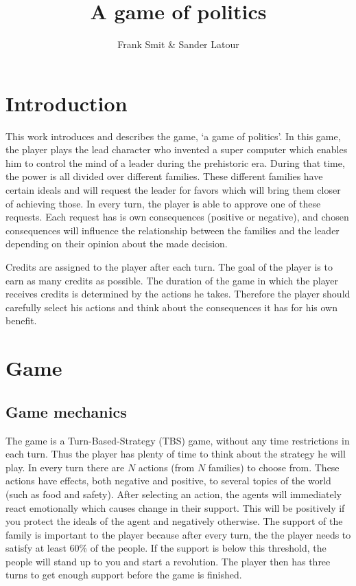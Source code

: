 \documentclass[11pt,a4paper]{article}
\author{Frank Smit \& Sander Latour}
\title{A game of politics}
\begin{document}
\maketitle

\section{Introduction}
This work introduces and describes the game, `a game of politics'. In this game, the player plays the lead character who invented a super computer which enables him to control the mind of a leader during the prehistoric era. During that time, the power is all divided over different families. These different families have certain ideals and will request the leader for favors which will bring them closer of achieving those. In every turn, the player is able to approve one of these requests. Each request has is own consequences (positive or negative), and chosen consequences will influence the relationship between the families and the leader depending on their opinion about the made decision.

Credits are assigned to the player after each turn. The goal of the player is to earn as many credits as possible. The duration of the game in which the player receives credits is determined by the actions he takes. Therefore the player should carefully select his actions and think about the consequences it has for his own benefit.  

\section{Game}
\subsection{Game mechanics}
The game is a Turn-Based-Strategy (TBS) game, without any time restrictions in each turn. Thus the player has plenty of time to think about the strategy he will play. In every turn there are $N$ actions (from $N$ families) to choose from. These actions have effects, both negative and positive, to several topics of the world (such as food and safety).  After selecting an action, the agents will immediately react emotionally which causes change in their support. This will be positively if you protect the ideals of the agent and negatively otherwise. The support of the family is important to the player because after every turn, the the player needs to satisfy at least 60\% of the people. If the support is below this threshold, the people will stand up to you and start a revolution. The player then has three turns to get enough support before the game is finished.
\end{document}
